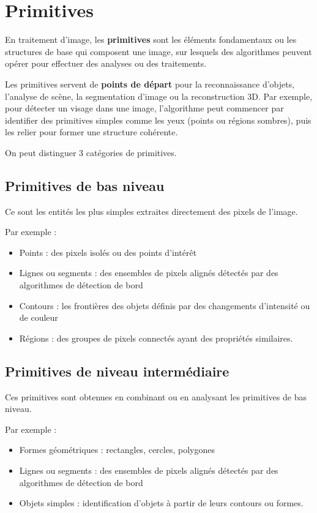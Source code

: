 \documentclass[a4paper,11pt,titlepage]{article} %
\begin{document}
	

\newpage
\section{Primitives}

En traitement d'image, les \textbf{primitives} sont les éléments fondamentaux ou les structures de base qui composent une image, sur lesquels des algorithmes peuvent opérer pour effectuer des analyses ou des traitements. 

Les primitives servent de \textbf{points de départ} pour la reconnaissance d'objets, l'analyse de scène, la segmentation d'image ou la reconstruction 3D. Par exemple, pour détecter un visage dans une image, l'algorithme peut commencer par identifier des primitives simples comme les yeux (points ou régions sombres), puis les relier pour former une structure cohérente.

\bigskip

On peut distinguer 3 catégories de primitives.

\subsection{Primitives de bas niveau}

Ce sont les entités les plus simples extraites directement des pixels de l'image. 

Par exemple :

\begin{itemize}
	\item Points : des pixels isolés ou des points d'intérêt
	\item Lignes ou segments : des ensembles de pixels alignés détectés par des algorithmes de détection de bord
	\item Contours : les frontières des objets définis par des changements d'intensité ou de couleur
	\item Régions : des groupes de pixels connectés ayant des propriétés similaires.
\end{itemize}


\subsection{Primitives de niveau intermédiaire}

Ces primitives sont obtenues en combinant ou en analysant les primitives de bas niveau. 

Par exemple :

\begin{itemize}
	\item Formes géométriques : rectangles, cercles, polygones
	\item Lignes ou segments : des ensembles de pixels alignés détectés par des algorithmes de détection de bord
	\item Objets simples : identification d'objets à partir de leurs contours ou formes.
\end{itemize}
\end{document}
